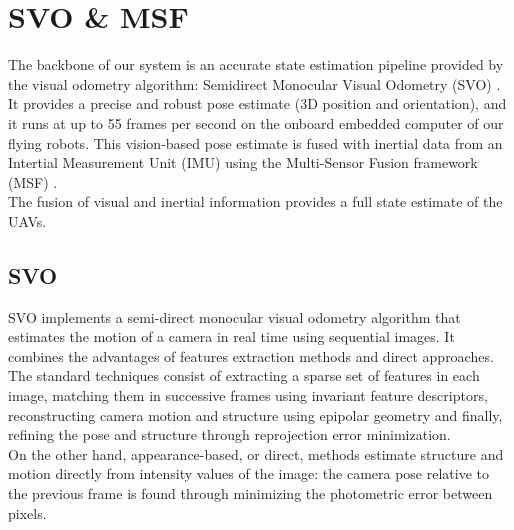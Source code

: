 \section{SVO \& MSF} \label{sec:state_estimation}
The backbone of our system is an accurate state estimation pipeline provided by the visual odometry algorithm: Semidirect Monocular Visual Odometry (SVO) \cite{forster2014svo}. It provides a precise and robust pose estimate (3D position and orientation), and it runs at up to 55 frames per second on the onboard embedded computer of our flying robots. This vision-based pose estimate is fused with inertial data from an Intertial Measurement Unit (IMU) using the Multi-Sensor Fusion framework (MSF) \cite{lynen2013robust}.\\
The fusion of visual and inertial information provides a full state estimate of the UAVs.\\


\subsection{SVO}

SVO implements a semi-direct monocular visual odometry algorithm that estimates the motion of a camera in real time using sequential images. It combines the advantages of features extraction methods and direct approaches.\\
The standard techniques consist of extracting a sparse set of features in each image, matching them in successive frames using invariant feature descriptors, reconstructing camera motion and structure using epipolar geometry and finally, refining the pose and structure through reprojection error minimization. \\
On the other hand, appearance-based, or direct, methods estimate structure and motion directly from intensity values of the image: the camera pose relative to the previous frame is found through minimizing the photometric error between pixels.\\


